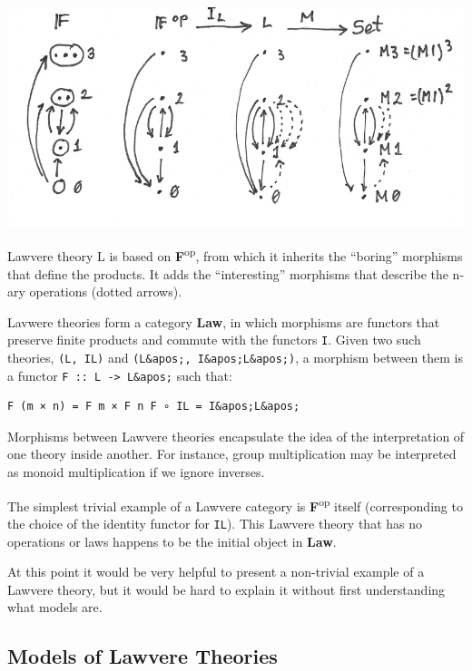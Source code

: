 \hypertarget{attachment_9070}{}
\includegraphics[width=5.31250in]{images/lawvere1.png}

Lawvere theory L is based on \textbf{F}\textsuperscript{op}, from which
it inherits the ``boring'' morphisms that define the products. It adds
the ``interesting'' morphisms that describe the n-ary operations (dotted
arrows).

Lavwere theories form a category \textbf{Law}, in which morphisms are
functors that preserve finite products and commute with the functors
\texttt{I}. Given two such theories, \texttt{(L,\ IL)} and
\texttt{(L\&apos;,\ I\&apos;L\&apos;)}, a morphism between them is a
functor \texttt{F\ ::\ L\ -\textgreater{}\ L\&apos;} such that:

\begin{verbatim}
F (m × n) = F m × F n F ∘ IL = I&apos;L&apos;
\end{verbatim}

Morphisms between Lawvere theories encapsulate the idea of the
interpretation of one theory inside another. For instance, group
multiplication may be interpreted as monoid multiplication if we ignore
inverses.

The simplest trivial example of a Lawvere category is
\textbf{F}\textsuperscript{op} itself (corresponding to the choice of
the identity functor for \texttt{IL}). This Lawvere theory that has no
operations or laws happens to be the initial object in \textbf{Law}.

At this point it would be very helpful to present a non-trivial example
of a Lawvere theory, but it would be hard to explain it without first
understanding what models are.

\subsection{Models of Lawvere
Theories}\label{models-of-lawvere-theories}

